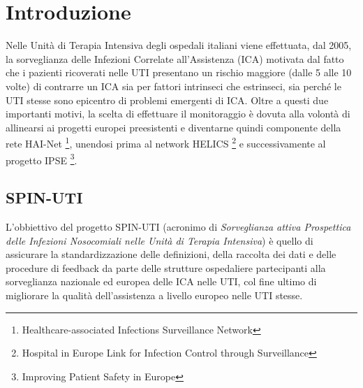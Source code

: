 \chapter{Introduzione}
Nelle Unità di Terapia Intensiva degli ospedali italiani viene effettuata, dal 2005, la sorveglianza delle Infezioni Correlate all'Assistenza (ICA) motivata dal fatto che i pazienti ricoverati nelle UTI presentano un rischio maggiore (dalle 5 alle 10 volte) di contrarre un ICA sia per fattori intrinseci che estrinseci, sia perché le UTI stesse sono epicentro di problemi emergenti di ICA. Oltre a questi due importanti motivi, la scelta di effettuare il monitoraggio è dovuta alla volontà di allinearsi ai progetti europei preesistenti e diventarne quindi componente della rete HAI-Net \footnote{Healthcare-associated Infections Surveillance Network},  
unendosi prima al network HELICS \footnote{Hospital in Europe Link for Infection Control through Surveillance} e successivamente al progetto IPSE \footnote{Improving Patient Safety in Europe}.
\section{SPIN-UTI}
L'obbiettivo del progetto SPIN-UTI (acronimo di \textit{Sorveglianza attiva Prospettica delle Infezioni Nosocomiali nelle Unità di Terapia Intensiva}) è quello di assicurare la standardizzazione delle definizioni, della raccolta dei dati e delle procedure di feedback da parte delle strutture ospedaliere partecipanti alla sorveglianza nazionale ed europea delle ICA nelle UTI, col fine ultimo di migliorare la qualità dell'assistenza a livello europeo nelle UTI stesse.
\newpage
